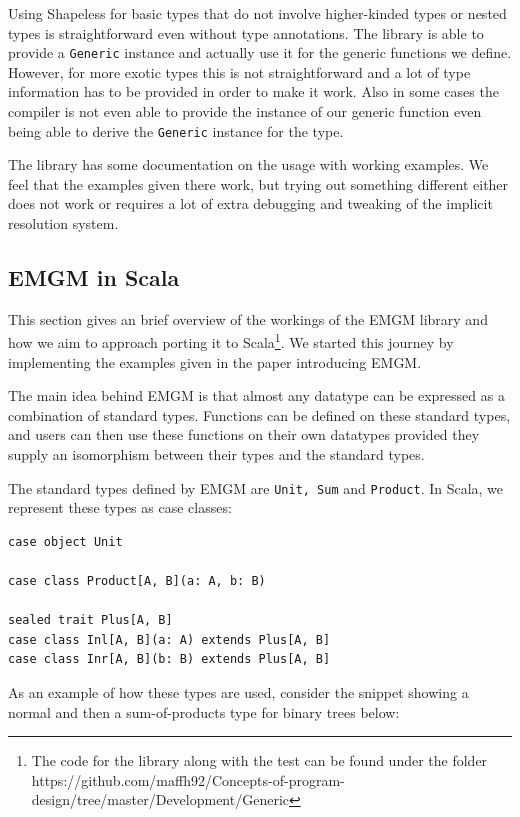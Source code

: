 \documentclass[a4paper]{article}
\newcommand{\scala}[1]{\lstinline[basicstyle=\ttfamily\color{white},style=scala]|#1|}
\begin{document}
Using Shapeless for basic types that do not involve higher-kinded types or nested types is straightforward even without type annotations. The library is able to provide a \scala{Generic} instance and actually use it for the generic functions we define. However, for more exotic types this is not straightforward and a lot of type information has to be provided in order to make it work. Also in some cases the compiler is not even able to provide the instance of our generic function even being able to derive the \scala{Generic} instance for the type.

The library has some documentation on the usage with working examples. We feel that the examples given there work, but trying out something different either does not work or requires a lot of extra debugging and tweaking of the implicit resolution system.

\subsection{EMGM in Scala}

This section gives an brief overview of the workings of the EMGM library and how we aim to approach porting it to Scala\footnote{The code for the library along with the test can be found under the folder https://github.com/maffh92/Concepts-of-program-design/tree/master/Development/Generic}. We started this journey by implementing the examples given in the paper introducing EMGM\cite{emgm}.

The main idea behind EMGM is that almost any datatype can be expressed as a combination of standard types. Functions can be defined on these standard types, and users can then use these functions on their own datatypes provided they supply an isomorphism between their types and the standard types. 

The standard types defined by EMGM are \texttt{Unit, Sum} and \texttt{Product}. In Scala, we represent these types as case classes:

\begin{lstlisting}[style=Scala]
case object Unit

case class Product[A, B](a: A, b: B)

sealed trait Plus[A, B]
case class Inl[A, B](a: A) extends Plus[A, B]
case class Inr[A, B](b: B) extends Plus[A, B]
\end{lstlisting}

As an example of how these types are used, consider the snippet showing a normal and then a sum-of-products type for binary trees below:
\end{document}
